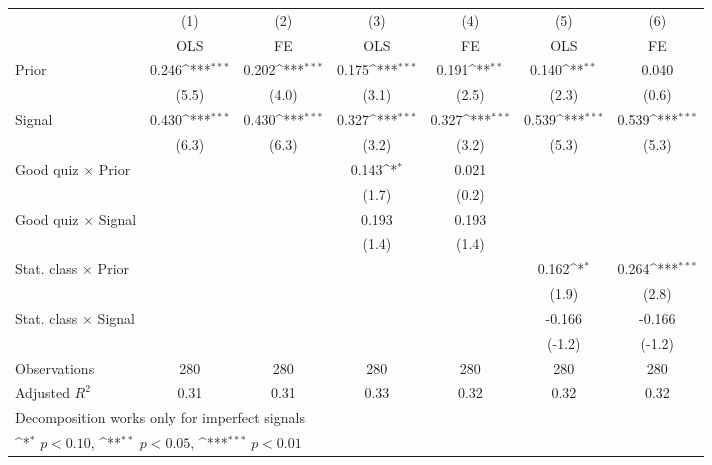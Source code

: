 \def\sym#1{\ifmmode^{#1}\else\(^{#1}\)\fi}
\begin{tabular}{l*{6}{c}}
\hline\hline
                &\multicolumn{1}{c}{(1)}&\multicolumn{1}{c}{(2)}&\multicolumn{1}{c}{(3)}&\multicolumn{1}{c}{(4)}&\multicolumn{1}{c}{(5)}&\multicolumn{1}{c}{(6)}\\
                &\multicolumn{1}{c}{OLS}&\multicolumn{1}{c}{FE}&\multicolumn{1}{c}{OLS}&\multicolumn{1}{c}{FE}&\multicolumn{1}{c}{OLS}&\multicolumn{1}{c}{FE}\\
\hline
Prior           &    0.246\sym{***}&    0.202\sym{***}&    0.175\sym{***}&    0.191\sym{**} &    0.140\sym{**} &    0.040         \\
                &    (5.5)         &    (4.0)         &    (3.1)         &    (2.5)         &    (2.3)         &    (0.6)         \\
Signal          &    0.430\sym{***}&    0.430\sym{***}&    0.327\sym{***}&    0.327\sym{***}&    0.539\sym{***}&    0.539\sym{***}\\
                &    (6.3)         &    (6.3)         &    (3.2)         &    (3.2)         &    (5.3)         &    (5.3)         \\
Good quiz $\times$ Prior&                  &                  &    0.143\sym{*}  &    0.021         &                  &                  \\
                &                  &                  &    (1.7)         &    (0.2)         &                  &                  \\
Good quiz $\times$ Signal&                  &                  &    0.193         &    0.193         &                  &                  \\
                &                  &                  &    (1.4)         &    (1.4)         &                  &                  \\
Stat. class $\times$ Prior&                  &                  &                  &                  &    0.162\sym{*}  &    0.264\sym{***}\\
                &                  &                  &                  &                  &    (1.9)         &    (2.8)         \\
Stat. class $\times$ Signal&                  &                  &                  &                  &   -0.166         &   -0.166         \\
                &                  &                  &                  &                  &   (-1.2)         &   (-1.2)         \\
\hline
Observations    &      280         &      280         &      280         &      280         &      280         &      280         \\
Adjusted \(R^{2}\)&     0.31         &     0.31         &     0.33         &     0.32         &     0.32         &     0.32         \\
\hline\hline
\multicolumn{7}{l}{\footnotesize Decomposition works only for imperfect signals}\\
\multicolumn{7}{l}{\footnotesize \sym{*} \(p<0.10\), \sym{**} \(p<0.05\), \sym{***} \(p<0.01\)}\\
\end{tabular}
